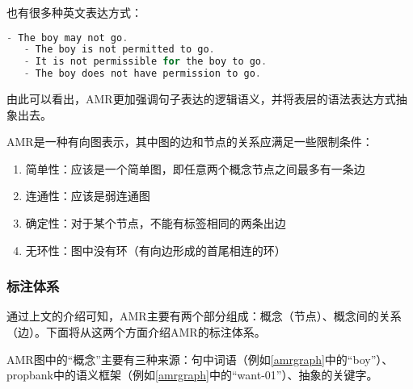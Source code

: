 \documentclass[master, winfont]{njuthesis}
\begin{document}
也有很多种英文表达方式：
\begin{lstlisting}[language=C]
   - The boy may not go.
   - The boy is not permitted to go.
   - It is not permissible for the boy to go.
   - The boy does not have permission to go.
\end{lstlisting}

由此可以看出，AMR更加强调句子表达的逻辑语义，并将表层的语法表达方式抽象出去。

AMR是一种有向图表示，其中图的边和节点的关系应满足一些限制条件\cite{Flanigan2014}：
\begin{enumerate}
  \item 简单性：应该是一个简单图，即任意两个概念节点之间最多有一条边
  \item 连通性：应该是弱连通图
  \item 确定性：对于某个节点，不能有标签相同的两条出边
  \item 无环性：图中没有环（有向边形成的首尾相连的环）
\end{enumerate}


\subsubsection{标注体系}
通过上文的介绍可知，AMR主要有两个部分组成：概念（节点）、概念间的关系（边）。下面将从这两个方面介绍AMR的标注体系。

AMR图中的“概念”主要有三种来源：句中词语（例如\ref{amrgraph}中的“boy”）、propbank中的语义框架（例如\ref{amrgraph}中的“want-01”）、抽象的关键字。
\end{document}

